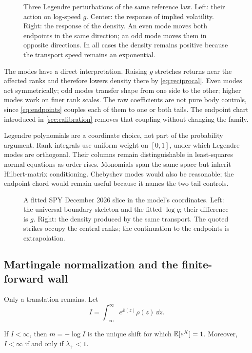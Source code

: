 \begin{figure}[htbp]
\centering
{}
\caption{Three Legendre perturbations of the same reference law.  Left:
their action on log-speed $g$.  Center: the response of implied volatility.
Right: the response of the density.  An even mode moves both endpoints in
the same direction; an odd mode moves them in opposite directions.  In all
cases the density remains positive because the transport speed remains an
exponential.}
\label{fig:modes}
\end{figure}

The modes have a direct interpretation.  Raising $g$ stretches returns near
the affected ranks and therefore lowers density there by \eqref{eq:reciprocal}.
Even modes act symmetrically; odd modes transfer shape from one side to the
other; higher modes work on finer rank scales.  The raw coefficients are not
pure body controls, since \eqref{eq:endpoints} couples each of them to one or
both tails.  The endpoint chart introduced in \cref{sec:calibration} removes
that coupling without changing the family.

Legendre polynomials are a coordinate choice, not part of the probability
argument.  Rank integrals use uniform weight on $[0,1]$, under which Legendre
modes are orthogonal.  Their columns remain distinguishable in least-squares
normal equations as order rises.  Monomials span the same space but inherit
Hilbert-matrix conditioning.  Chebyshev modes would also be reasonable; the
endpoint chord would remain useful because it names the two tail controls.

\begin{figure}[htbp]
\centering
{}
\caption{A fitted SPY December 2026 slice in the model's coordinates.  Left:
the universal boundary skeleton and the fitted $\log q$; their difference is
$g$.  Right: the density produced by the same transport.  The quoted strikes
occupy the central ranks; the continuation to the endpoints is extrapolation.}
\label{fig:lqdchart}
\end{figure}

\subsection{Martingale normalization and the finite-forward wall}

Only a translation remains.  Let
\[
I=\int_{-\infty}^{\infty}e^{\bar x(z)}\rho(z)\,\dd z.
\]

\begin{proposition}
\label{prop:shift}
If $I<\infty$, then $m=-\log I$ is the unique shift for which
$\mathbb{E}[e^X]=1$.  Moreover, $I<\infty$ if and only if $\lambda_+<1$.
\end{proposition}

